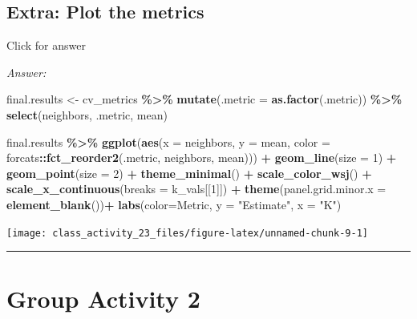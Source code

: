 \documentclass[
]{book}
\newenvironment{Shaded}{\begin{snugshade}}{\end{snugshade}}
\newcommand{\AttributeTok}[1]{\textcolor[rgb]{0.13,0.29,0.53}{#1}}
\newcommand{\DecValTok}[1]{\textcolor[rgb]{0.00,0.00,0.81}{#1}}
\newcommand{\FunctionTok}[1]{\textcolor[rgb]{0.13,0.29,0.53}{\textbf{#1}}}
\newcommand{\NormalTok}[1]{#1}
\newcommand{\OtherTok}[1]{\textcolor[rgb]{0.56,0.35,0.01}{#1}}
\newcommand{\SpecialCharTok}[1]{\textcolor[rgb]{0.81,0.36,0.00}{\textbf{#1}}}
\newcommand{\StringTok}[1]{\textcolor[rgb]{0.31,0.60,0.02}{#1}}
\begin{document}
\hypertarget{extra-plot-the-metrics}{%
\subsection{Extra: Plot the metrics}\label{extra-plot-the-metrics}}

Click for answer

\emph{Answer:}

\begin{Shaded}
\begin{Highlighting}[]
\NormalTok{final.results }\OtherTok{\textless{}{-}}\NormalTok{ cv\_metrics }\SpecialCharTok{\%\textgreater{}\%}  \FunctionTok{mutate}\NormalTok{(}\AttributeTok{.metric =} \FunctionTok{as.factor}\NormalTok{(.metric)) }\SpecialCharTok{\%\textgreater{}\%}
  \FunctionTok{select}\NormalTok{(neighbors, .metric, mean)}

\NormalTok{final.results }\SpecialCharTok{\%\textgreater{}\%}
  \FunctionTok{ggplot}\NormalTok{(}\FunctionTok{aes}\NormalTok{(}\AttributeTok{x =}\NormalTok{ neighbors, }\AttributeTok{y =}\NormalTok{ mean, }\AttributeTok{color =}\NormalTok{ forcats}\SpecialCharTok{::}\FunctionTok{fct\_reorder2}\NormalTok{(.metric, neighbors, mean))) }\SpecialCharTok{+}
  \FunctionTok{geom\_line}\NormalTok{(}\AttributeTok{size =} \DecValTok{1}\NormalTok{) }\SpecialCharTok{+}
  \FunctionTok{geom\_point}\NormalTok{(}\AttributeTok{size =} \DecValTok{2}\NormalTok{) }\SpecialCharTok{+}
  \FunctionTok{theme\_minimal}\NormalTok{() }\SpecialCharTok{+}
  \FunctionTok{scale\_color\_wsj}\NormalTok{() }\SpecialCharTok{+} 
  \FunctionTok{scale\_x\_continuous}\NormalTok{(}\AttributeTok{breaks =}\NormalTok{ k\_vals[[}\DecValTok{1}\NormalTok{]]) }\SpecialCharTok{+}
  \FunctionTok{theme}\NormalTok{(}\AttributeTok{panel.grid.minor.x =} \FunctionTok{element\_blank}\NormalTok{())}\SpecialCharTok{+}
  \FunctionTok{labs}\NormalTok{(}\AttributeTok{color=}\StringTok{\textquotesingle{}Metric\textquotesingle{}}\NormalTok{, }\AttributeTok{y =} \StringTok{"Estimate"}\NormalTok{, }\AttributeTok{x =} \StringTok{"K"}\NormalTok{)}
\end{Highlighting}
\end{Shaded}

\texttt{[image: class\_activity\_23\_files/figure-latex/unnamed-chunk-9-1]}

\begin{center}\rule{0.5\linewidth}{0.5pt}\end{center}

\hypertarget{group-activity-2-7}{%
\section{Group Activity 2}\label{group-activity-2-7}}
\end{document}
